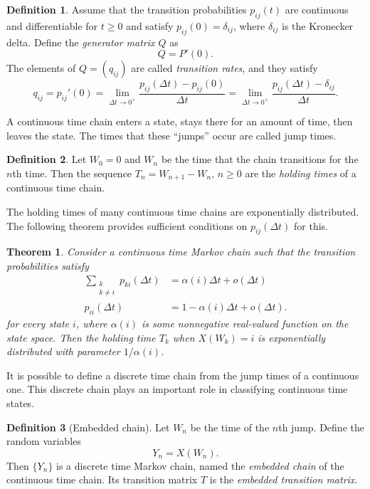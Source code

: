 \documentclass[12pt]{article}
\newtheorem{thm}{Theorem}[section]
\theoremstyle{definition}
\newtheorem{defn}{Definition}
\begin{document}
\begin{defn}
    \label{defn:transition-rates}
    Assume that the transition probabilities $p_{ij}(t)$ are continuous and
    differentiable for $t \geq 0$ and satisfy $p_{ij}(0) = \delta_{ij}$, where
    $\delta_{ij}$ is the Kronecker delta. Define the \emph{generator matrix
    $Q$} as $$Q = P'(0).$$ The elements of $Q = (q_{ij})$ are called
    \emph{transition rates}, and they satisfy
    \[
        q_{ij} = p_{ij}'(0) = \lim_{\Delta t \to 0^+} \frac{p_{ij}(\Delta t) -
        p_{ij}(0)}{\Delta t} = \lim_{\Delta t \to 0^+} \frac{p_{ij}(\Delta t) -
        \delta_{ij}}{\Delta t}.
    \]
\end{defn}

A continuous time chain enters a state, stays there for an amount of time, then
leaves the state. The times that these ``jumps'' occur are called jump times.

\begin{defn}
    \label{defn:holding-time}
    Let $W_0 = 0$ and $W_n$ be the time that the chain transitions for the
    $n$th time. Then the sequence $T_n = W_{n + 1} - W_n$, $n \geq 0$ are the
    \emph{holding times} of a continuous time chain.
\end{defn}

The holding times of many continuous time chains are exponentially distributed.
The following theorem provides sufficient conditions on $p_{ij}(\Delta t)$ for
this.

\begin{thm}
    \label{thm:general-holding-times}
    Consider a continuous time Markov chain such that the transition
    probabilities satisfy
    \begin{align*}
    \sum_{\substack{k \\ k \neq i}} p_{ki}(\Delta t) &=
        \alpha(i) \Delta t + o(\Delta t) \\
%
        p_{ii}(\Delta t) &= 1 - \alpha(i) \Delta t + o(\Delta t).
    \end{align*}
    for every state $i$, where $\alpha(i)$ is some nonnegative real-valued
    function on the state space. Then the holding time $T_k$ when $X(W_k) = i$
    is exponentially distributed with parameter $1/\alpha(i)$.
\end{thm}

It is possible to define a discrete time chain from the jump times of a
continuous one. This discrete chain plays an important role in classifying
continuous time states.

\begin{defn}[Embedded chain]
    \label{defn:embedded-chain}
    Let $W_n$ be the time of the $n$th jump. Define the random variables $$Y_n
    = X(W_n).$$ Then $\{Y_n\}$ is a discrete time Markov chain, named the
    \emph{embedded chain} of the continuous time chain. Its transition matrix
    $T$ is the \emph{embedded transition matrix}.
\end{defn}
\end{document}
